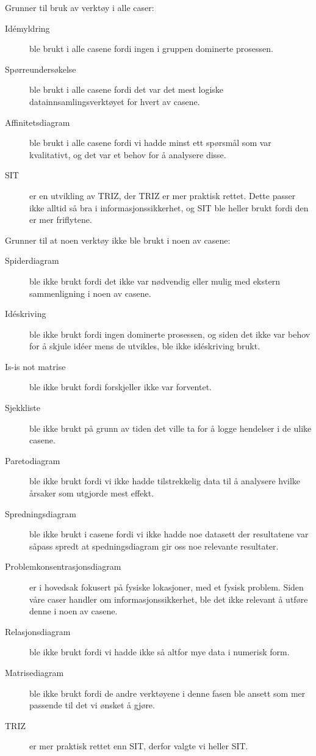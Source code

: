 Grunner til bruk av verktøy i alle caser:
\begin{description}
    \item[Idémyldring] ble brukt i alle casene fordi ingen i gruppen dominerte prosessen.
    \item[Spørreundersøkelse] ble brukt i alle casene fordi det var det mest logiske datainnsamlingsverktøyet for hvert av casene.
    \item[Affinitetsdiagram] ble brukt i alle casene fordi vi hadde minst ett spørsmål som var kvalitativt, og det var et behov for å analysere disse.
    \item[SIT] er en utvikling av TRIZ, der TRIZ er mer praktisk rettet. Dette passer ikke alltid så bra i informasjonssikkerhet, og SIT ble heller brukt fordi den er mer friflytene. 
\end{description}

Grunner til at noen verktøy ikke ble brukt i noen av casene:
\begin{description}
    \item[Spiderdiagram] ble ikke brukt fordi det ikke var nødvendig eller mulig med ekstern sammenligning i noen av casene.
    \item[Idéskriving] ble ikke brukt fordi ingen dominerte prosessen, og siden det ikke var behov for å skjule idéer mens de utvikles, ble ikke idéskriving brukt.
    \item[Is-is not matrise] ble ikke brukt fordi forskjeller ikke var forventet.
    \item[Sjekkliste] ble ikke brukt på grunn av tiden det ville ta for å logge hendelser i de ulike casene. 
    \item[Paretodiagram] ble ikke brukt fordi vi ikke hadde tilstrekkelig data til å analysere hvilke årsaker som utgjorde mest effekt. 
    \item[Spredningsdiagram] ble ikke brukt i casene fordi vi ikke hadde noe datasett der resultatene var såpass spredt at spedningsdiagram gir oss noe relevante resultater. 
    \item[Problemkonsentrasjonsdiagram] er i hovedsak fokusert på fysiske lokasjoner, med et fysisk problem. Siden våre caser handler om informasjonssikkerhet, ble det ikke relevant å utføre denne i noen av casene. 
    \item[Relasjonsdiagram] ble ikke brukt fordi vi hadde ikke så altfor mye data i numerisk form. 
    \item[Matrisediagram] ble ikke brukt fordi de andre verktøyene i denne fasen ble ansett som mer passende til det vi ønsket å gjøre.
    \item[TRIZ] er mer praktisk rettet enn SIT, derfor valgte vi heller SIT. 
\end{description}


